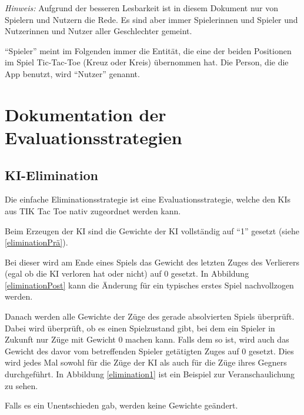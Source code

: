 \documentclass[titlepage]{scrartcl}
\title{\TicTacToe}
\subtitle{Dokumentation}
\date{Stand: \today}
\author{Jonas, Luis, Leonid}
\newcommand{\TicTacToe}{TI\reflectbox K Tac Toe}
\begin{document}
\maketitle

\emph{Hinweis:} Aufgrund der besseren Lesbarkeit ist in diesem Dokument nur von Spielern und Nutzern die Rede.
Es sind aber immer Spielerinnen und Spieler und Nutzerinnen und Nutzer aller Geschlechter gemeint.

"`Spieler"' meint im Folgenden immer die Entität, die eine der beiden Positionen im Spiel Tic-Tac-Toe (Kreuz oder Kreis) übernommen hat.
Die Person, die die App benutzt, wird "`Nutzer"' genannt.
\section{Dokumentation der Evaluationsstrategien}
\subsection{KI-Elimination}
Die einfache Eliminationsstrategie ist eine Evaluationsstrategie, welche den KIs aus \TicTacToe{} nativ zugeordnet werden kann.

Beim Erzeugen der KI sind die Gewichte der KI vollständig auf "`1"' gesetzt (siehe \ref{eliminationPrä}).

Bei dieser wird am Ende eines Spiels das Gewicht des letzten Zuges des Verlierers (egal ob die KI verloren hat oder nicht) auf \glqq{}0\grqq{} gesetzt.
In Abbildung \ref{eliminationPost} kann die Änderung für ein typisches erstes Spiel nachvollzogen werden.

Danach werden alle Gewichte der Züge des gerade absolvierten Spiels überprüft. Dabei wird überprüft, ob es einen Spielzustand gibt, bei dem ein Spieler in Zukunft nur Züge mit Gewicht 0 machen kann.
Falls dem so ist, wird auch das Gewicht des davor vom betreffenden Spieler getätigten Zuges auf \glqq{}0\grqq{} gesetzt.
Dies wird jedes Mal sowohl für die Züge der KI als auch für die Züge ihres Gegners durchgeführt.
In Abbildung \ref{elimination1} ist ein Beispiel zur Veranschaulichung zu sehen.

Falls es ein Unentschieden gab, werden keine Gewichte geändert. 
\end{document}
